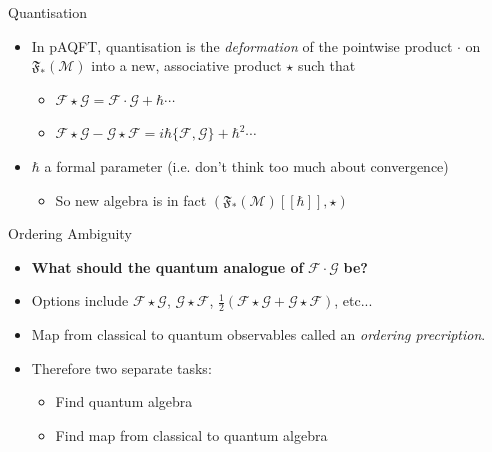 \documentclass[pdf, fleqn, compress, handout]{beamer}
\newcommand{\mathsterm}[1]{{\itshape\color{dark-teal!80}#1}}
\begin{document}
\begin{frame}{Quantisation}
	\begin{itemize}
		\item	In pAQFT, quantisation is the \textit{deformation} of
				the pointwise product $\cdot$ on $\mathfrak{F}_*(\mathcal{M})$ into a new,
				associative product $\star$ such that
				\begin{itemize}
					\item[(i)] $\mathcal{F} \star \mathcal{G} = \mathcal{F} \cdot \mathcal{G} + \hbar \cdots$
					\item[(ii)] $
								\mathcal{F} \star \mathcal{G} -
								\mathcal{G} \star \mathcal{F} =
								i\hbar \{\mathcal{F}, \mathcal{G}\} +
								\hbar^2 \cdots
								$
				\end{itemize}
		\pause
		\item	$\hbar$ a formal parameter (i.e. don't think too much about convergence)
		\begin{itemize}
			\item	So new algebra is in fact
					$\left(\mathfrak{F}_*(\mathcal{M})[[\hbar]], \star \right)$
		\end{itemize}
	\end{itemize}
\end{frame}

\begin{frame}{Ordering Ambiguity}
	\begin{itemize}
		\item	\textbf{What should the quantum analogue of}
				$\mathcal{F} \cdot \mathcal{G}$ \textbf{be?}
		\pause
		\item	Options include
				$\mathcal{F} \star \mathcal{G}$,
				$\mathcal{G} \star \mathcal{F}$,
				$\frac{1}{2} \left( 
				\mathcal{F} \star \mathcal{G} + 
				\mathcal{G} \star \mathcal{F} \right)
				$, etc...
		\pause
		\item	Map from classical to quantum observables called an
				\mathsterm{ordering precription}.
		\pause
		\item   Therefore two separate tasks:
		\begin{itemize}
			\item[(i)] Find quantum algebra
			\item[(ii)] Find map from classical to quantum algebra
		\end{itemize}
	\end{itemize}
\end{frame}
\end{document}
